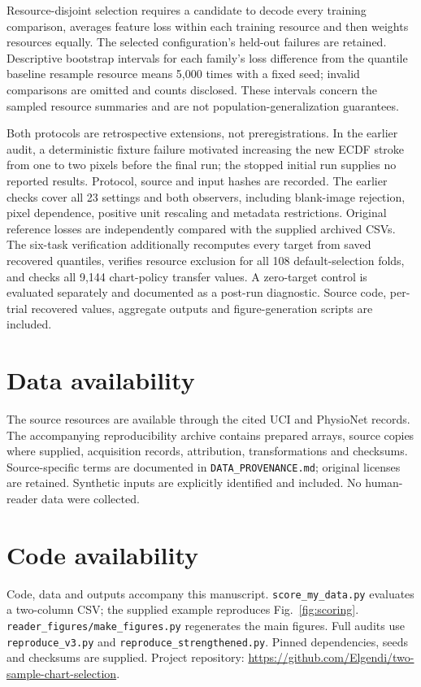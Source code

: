\documentclass[11pt]{article}
\begin{document}
Resource-disjoint selection requires a candidate to decode every training comparison, averages feature loss within each training resource and then weights resources equally. The selected configuration's held-out failures are retained. Descriptive bootstrap intervals for each family's loss difference from the quantile baseline resample resource means 5,000 times with a fixed seed; invalid comparisons are omitted and counts disclosed. These intervals concern the sampled resource summaries and are not population-generalization guarantees.

Both protocols are retrospective extensions, not preregistrations. In the earlier audit, a deterministic fixture failure motivated increasing the new ECDF stroke from one to two pixels before the final run; the stopped initial run supplies no reported results. Protocol, source and input hashes are recorded. The earlier checks cover all 23 settings and both observers, including blank-image rejection, pixel dependence, positive unit rescaling and metadata restrictions. Original reference losses are independently compared with the supplied archived CSVs. The six-task verification additionally recomputes every target from saved recovered quantiles, verifies resource exclusion for all 108 default-selection folds, and checks all 9,144 chart-policy transfer values. A zero-target control is evaluated separately and documented as a post-run diagnostic. Source code, per-trial recovered values, aggregate outputs and figure-generation scripts are included.

\section*{Data availability}
The source resources are available through the cited UCI and PhysioNet records. The accompanying reproducibility archive contains prepared arrays, source copies where supplied, acquisition records, attribution, transformations and checksums. Source-specific terms are documented in \texttt{DATA\_PROVENANCE.md}; original licenses are retained. Synthetic inputs are explicitly identified and included. No human-reader data were collected.

\section*{Code availability}
Code, data and outputs accompany this manuscript. \texttt{score\_my\_data.py} evaluates a two-column CSV; the supplied example reproduces Fig.~\ref{fig:scoring}. \texttt{reader\_figures/make\_figures.py} regenerates the main figures. Full audits use \texttt{reproduce\_v3.py} and \texttt{reproduce\_strengthened.py}. Pinned dependencies, seeds and checksums are supplied. Project repository: \url{https://github.com/Elgendi/two-sample-chart-selection}.
\end{document}
